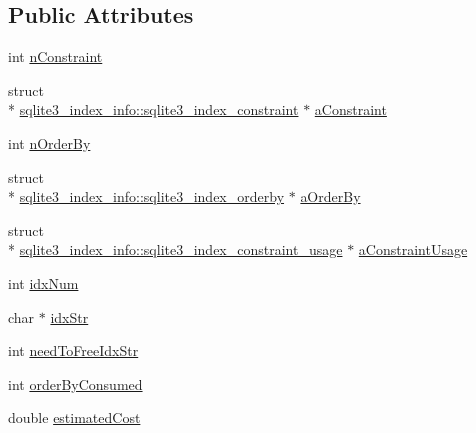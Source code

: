 \subsection*{Public Attributes}
\begin{DoxyCompactItemize}
\item 
int \hyperlink{structsqlite3__index__info_ae861993a30ce914a5214eab2579d935a}{n\-Constraint}
\item 
struct \\*
\hyperlink{structsqlite3__index__info_1_1sqlite3__index__constraint}{sqlite3\-\_\-index\-\_\-info\-::sqlite3\-\_\-index\-\_\-constraint} $\ast$ \hyperlink{structsqlite3__index__info_a634aa93834e2b47acf34454746c0f248}{a\-Constraint}
\item 
int \hyperlink{structsqlite3__index__info_a3ef850fdc57eddbc8189fe84d0a9044e}{n\-Order\-By}
\item 
struct \\*
\hyperlink{structsqlite3__index__info_1_1sqlite3__index__orderby}{sqlite3\-\_\-index\-\_\-info\-::sqlite3\-\_\-index\-\_\-orderby} $\ast$ \hyperlink{structsqlite3__index__info_a6823a68979e19d8e332389361e920ef9}{a\-Order\-By}
\item 
struct \\*
\hyperlink{structsqlite3__index__info_1_1sqlite3__index__constraint__usage}{sqlite3\-\_\-index\-\_\-info\-::sqlite3\-\_\-index\-\_\-constraint\-\_\-usage} $\ast$ \hyperlink{structsqlite3__index__info_a79b8a969dd7d582fc2ea3c0fbc5adb56}{a\-Constraint\-Usage}
\item 
int \hyperlink{structsqlite3__index__info_afcee17707a1c147fbd55c23c807fdae3}{idx\-Num}
\item 
char $\ast$ \hyperlink{structsqlite3__index__info_ac63f4ebfe8d9331b040fa9e0e47c9d70}{idx\-Str}
\item 
int \hyperlink{structsqlite3__index__info_a5410066c067c3891cdf165c70cc4d6b1}{need\-To\-Free\-Idx\-Str}
\item 
int \hyperlink{structsqlite3__index__info_a5515d9de0f37f68d7e0930c20a668b29}{order\-By\-Consumed}
\item 
double \hyperlink{structsqlite3__index__info_aa8b4fe1d2ee38aab57ba5e1da00d7830}{estimated\-Cost}
\end{DoxyCompactItemize}


